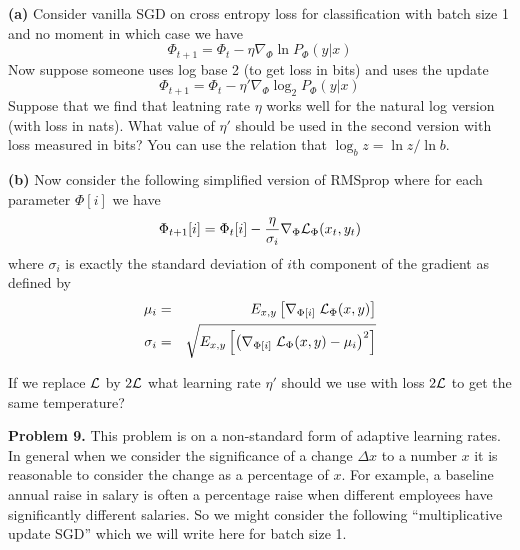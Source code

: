 \documentclass{article}
\newcommand{\solution}[1]{}
\begin{document}
    \medskip

{\bf (a)} Consider vanilla SGD on cross entropy loss for classification with batch size 1 and no moment in which case we have
$$\Phi_{t+1} = \Phi_t - \eta \nabla_\Phi \ln P_\Phi(y|x)$$
Now suppose someone uses log base 2 (to get loss in bits) and uses the update
$$\Phi_{t+1} = \Phi_t - \eta' \nabla_\Phi \log_2 P_\Phi(y|x)$$
Suppose that we find that leatning rate $\eta$ works well for the natural log version (with loss in nats).
What value of $\eta'$ should be used in the second version with loss measured in bits?
You can use the relation that $\log_b z = \ln z/\ln b$.

\solution{We have
  \begin{eqnarray*}
    - \Delta \Phi & = & \eta'\nabla_\Phi \log_2 P(\Phi) \\
    & = & \eta' \nabla_\Phi \ln P(\Phi)/\ln 2 \\
    & = & \frac{\eta'}{\ln 2} \nabla_\Phi \ln P(\Phi)
  \end{eqnarray*}
  To make the two updates the same we set $\eta' = \eta \ln 2$
  }

\medskip
    
{\bf (b)} Now consider the following simplified version of RMSprop where for each parameter $\Phi[i]$ we have
$$\Phi_{t+1}[i] = \Phi_t[i] - \frac{\eta}{\sigma_i} \nabla_\Phi {\cal L}_\Phi(x_t,y_t)$$
where $\sigma_i$ is exactly the standard deviation of $i$th component of the gradient as defined by
\begin{eqnarray*}
  \mu_i & = & E_{x,y}\left[\nabla_{\Phi[i]} \;{\cal L}_\Phi(x,y) \right] \\
  \sigma_i & = & \sqrt{E_{x,y}\left[\left(\nabla_{\Phi[i]} \;{\cal L}_\Phi(x,y) - \mu_i\right)^2\right]}
\end{eqnarray*}

If we replace ${\cal L}$ by $2{\cal L}$ what learning rate $\eta'$ should we use with loss $2{\cal L}$ to get the same temperature?

\solution{If we double the loss function we also double $\sigma_i$ and we have $\eta' = \eta$.  For RMSprop we get that the learning rate is (approximately) invariant
to scaling the loss function.  It is not clear whether this has any significance.}

\bigskip
{\bf Problem 9.}  This problem is on a non-standard form of adaptive learning rates.  In general when we consider the significance of a change $\Delta x$ to a number $x$ it is reasonable to consider
the change as a percentage of $x$.  For example, a baseline annual raise in salary is often a percentage raise when different employees have significantly different salaries.  So we might consider the following
``multiplicative update SGD'' which we will write here for batch size 1.
\end{document}
